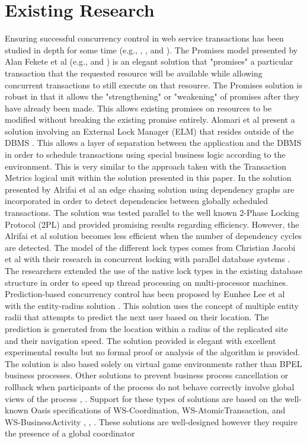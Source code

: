 \documentclass[conference]{IEEEtran}
\begin{document}
\section{Existing Research}
\label{sec:existing_research}
Ensuring successful concurrency control in web service transactions has been studied in depth for some time (e.g., \cite{Fekete_Promises}, \cite{Fekete_IsolationSupport}, and \cite{Alrifai_Distributed_Managment}). The Promises model presented by Alan Fekete et al (e.g., \cite{Fekete_Promises} and \cite{Fekete_IsolationSupport}) is an elegant solution that "promises" a particular transaction that the requested resource will be available while allowing concurrent transactions to still execute on that resource. The Promises solution is robust in that it allows the "strengthening" or "weakening" of promises after they have already been made. This allows existing promises on resources to be modified without breaking the existing promise entirely. Alomari et al present a solution involving an External Lock Manager (ELM) that resides outside of the DBMS \cite{Fekete_SnapshotIso}. This allows a layer of separation between the application and the DBMS in order to schedule transactions using special business logic according to the environment. This is very similar to the approach taken with the Transaction Metrics logical unit within the solution presented in this paper. In the solution presented by Alrifai et al \cite{Alrifai_Distributed_Managment} an edge chasing solution using dependency graphs are incorporated in order to detect dependencies between globally scheduled transactions. The solution was tested parallel to the well known 2-Phase Locking Protocol (2PL) and provided promising results regarding efficiency. However, the Alrifai et al solution becomes less efficient when the number of dependency cycles are detected. The model of the different lock types comes from Christian Jacobi et al with their research in concurrent locking with parallel database systems \cite{Jacobi_Locking}. The researchers extended the use of the native lock types in the existing database structure in order to speed up thread processing on multi-processor machines. Prediction-based concurrency control has been proposed by Eunhee Lee et al with the entity-radius solution \cite{Eunhee_PredictionBasedCC}. This solution uses the concept of multiple entity radii that attempts to predict the next user based on their location. The prediction is generated from the location within a radius of the replicated site and their navigation speed. The solution provided is elegant with excellent experimental results but no formal proof or analysis of the algorithm is provided. The solution is also based solely on virtual game environments rather than BPEL business processes. Other solutions to prevent business process cancellation or rollback when participants of the process do not behave correctly involve global views of the process \cite{Riegen_RuleBased}, \cite{Fekete_RAMP}. Support for these types of solutions are based on the well-known Oasis specifications of WS-Coordination, WS-AtomicTransaction, and WS-BusinessActivity \cite{WSCO}, \cite{WSAT}, \cite{WSBA}. These solutions are well-designed however they require the presence of a global coordinator 
\end{document}
